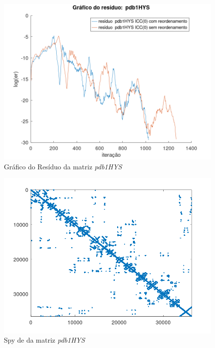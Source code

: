 \begin{figure}[H]
    \centering
         \centering
         \includegraphics[width=.6\linewidth]{images/pdb1HYS.png}
         \caption{Gráfico do Resíduo da matriz \textit{pdb1HYS}}
         \label{fig:pdb-res}
\end{figure}

\begin{figure}[H]
    \centering
         \centering
         \includegraphics[width=.5\linewidth]{images/pdb1HYS_spyA.png}
         \caption{Spy de da matriz \textit{pdb1HYS}}
         \label{fig:pdb-spy-a}
\end{figure}

